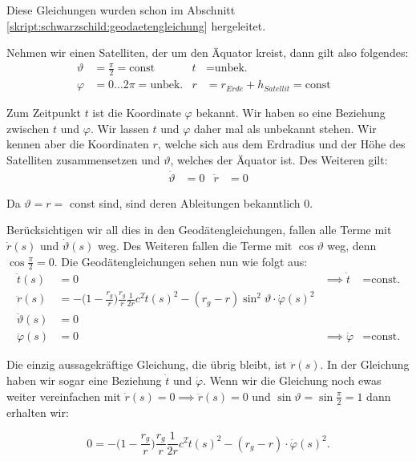 \begin{refsection}
\noindent{}Diese Gleichungen wurden schon im Abschnitt \ref{skript:schwarzschild:geodaetengleichung} hergeleitet. 

Nehmen wir einen Satelliten, der um den Äquator kreist, dann gilt also folgendes:
\begin{align*}
\vartheta &= \frac{\pi}{2} = \text{const} & 
t & = \text{unbek.} & \\
\varphi &= 0\dots2\pi = \text{unbek.} &
r &= r_{Erde} + h_{Satellit} = \text{const}
\end{align*}

\noindent{}Zum Zeitpunkt $t$ ist die Koordinate $\varphi$ bekannt. Wir haben so eine Beziehung zwischen $t$ und $\varphi$. Wir lassen $t$ und \( \varphi \) daher mal als unbekannt stehen. Wir kennen aber die Koordinaten \(  r \), welche sich aus dem Erdradius und der Höhe des Satelliten zusammensetzen und \( \vartheta \), welches der Äquator ist. Des Weiteren gilt:
\begin{align*}
\dot \vartheta &= 0 & 
\dot r &= 0
\end{align*}

\noindent{}Da $\vartheta = r =$ const sind, sind deren Ableitungen bekanntlich 0.

 Berücksichtigen wir all dies in den Geodätengleichungen, fallen alle Terme mit \( \dot r(s) \) und \( \dot \vartheta (s) \) weg. Des Weiteren fallen die Terme mit \( \cos \vartheta \) weg, denn \( \cos \frac{\pi}{2} = 0 \). Die Geodätengleichungen sehen nun wie folgt aus:
\begin{align*}
\ddot t(s) &= 0 & \implies \dot t &= \text{const.}\\
\ddot r(s)
&=
-\biggl(1-\frac{r_g}{r}\biggr)\frac{r_g}{r}\frac1{2r}c^2\dot t(s)^2
- (r_g-r)\sin^2 \vartheta \cdot \dot \varphi(s)^2 \\
\ddot \vartheta(s) &= 0 \\
\ddot \varphi(s) &= 0 & \implies \dot \varphi & = \text{const.}
\end{align*}

\noindent{}Die einzig aussagekräftige Gleichung, die übrig bleibt, ist \( \ddot r(s) \). In der Gleichung haben wir sogar eine Beziehung \( \dot t \) und \( \dot \varphi \). Wenn wir die Gleichung noch ewas weiter vereinfachen mit \( \dot r(s) = 0 \implies \ddot r(s) = 0 \) und \( \sin \vartheta = \sin \frac{\pi}{2} = 1 \) dann erhalten wir:

\begin{equation}
0 = -\biggl(1-\frac{r_g}{r}\biggr)\frac{r_g}{r}\frac1{2r}c^2\dot t(s)^2 - (r_g-r)\cdot \dot \varphi(s)^2.
\end{equation}


\end{refsection}

